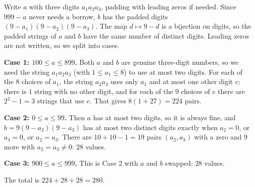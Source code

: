 Write $a$ with three digits $a_1a_2a_3$, padding with leading zeros if needed. Since $999-a$ never needs a borrow, $b$ has the padded digits $(9-a_1)(9-a_2)(9-a_3)$. The map $d\mapsto9-d$ is a bijection on digits, so the padded strings of $a$ and $b$ have the same number of distinct digits. Leading zeros are not written, so we split into cases.

\textbf{Case 1: $100\le a\le899$.} Both $a$ and $b$ are genuine three-digit numbers, so we need the string $a_1a_2a_3$ (with $1\le a_1\le8$) to use at most two digits. For each of the $8$ choices of $a_1$, the string $a_2a_3$ uses only $a_1$ and at most one other digit $e$: there is $1$ string with no other digit, and for each of the $9$ choices of $e$ there are $2^2-1=3$ strings that use $e$. That gives $8(1+27)=224$ pairs.

\textbf{Case 2: $0\le a\le99$.} Then $a$ has at most two digits, so it is always fine, and $b=\overline{9(9-a_2)(9-a_3)}$ has at most two distinct digits exactly when $a_2=0$, or $a_3=0$, or $a_2=a_3$. There are $10+10-1=19$ pairs $(a_2,a_3)$ with a zero and $9$ more with $a_2=a_3\ne0$: $28$ values.

\textbf{Case 3: $900\le a\le999$.} This is Case 2 with $a$ and $b$ swapped: $28$ values.

The total is $224+28+28=\boxed{280}$.
